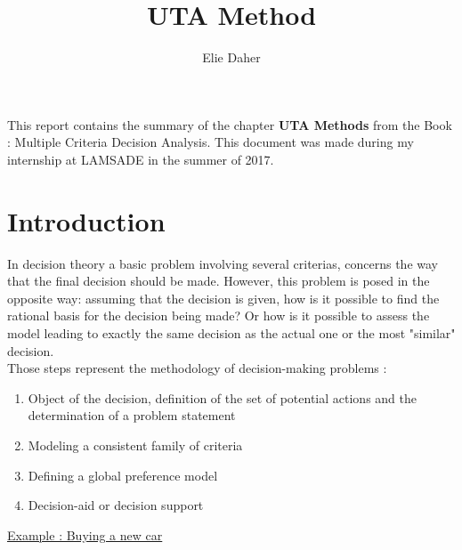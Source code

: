 \documentclass{report}
\title{UTA Method}
\author{Elie Daher}
\begin{document}
\maketitle
\abstract This report contains the summary of the chapter \textbf{UTA Methods} from the Book : Multiple Criteria Decision Analysis. This document was made during my internship at LAMSADE in the summer of 2017.
\tableofcontents{}

\chapter{Introduction}
In decision theory a basic problem involving several criterias, concerns the way that the final decision should be made. However, this problem is posed in the opposite way: assuming that the decision is given, how is it possible to find the rational basis for the decision being made? Or how is it possible to assess the model leading to exactly the same decision as the actual one or the most "similar" decision.\\

Those steps represent the methodology of decision-making problems : 
\begin{enumerate}
\item Object of the decision, definition of the set of potential actions and the determination of a problem statement
\item Modeling a consistent family of criteria
\item Defining a global preference model
\item Decision-aid or decision support
\end{enumerate}

\underline{Example : Buying a new car} \\
\end{document}
